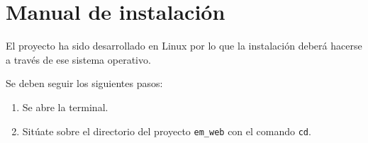 \chapter{Manual de instalación}

El proyecto ha sido desarrollado en Linux por lo que la instalación deberá hacerse a través de ese sistema operativo. 


Se deben seguir los siguientes pasos:

\begin{enumerate}
\item Se abre la terminal.
\item Sitúate sobre el directorio del proyecto \texttt{em_web} con el comando \texttt{cd}.
%
%
%
%
%
\end{enumerate}
